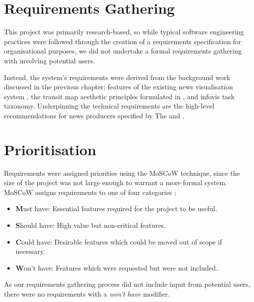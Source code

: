 \section{Requirements Gathering}
This project was primarily research-based, so while typical software engineering practices were followed through the creation of a requirements specification for organisational purposes, we did not undertake a formal requirements gathering with involving potential users.

Instead, the system's requirements were derived from the background work discussed in the previous chapter; features of the existing news visualisation system \citep{GeneratingInformationMaps}, the transit map aesthetic principles formulated in \citep{AutomaticMetroMapLayoutThesis, AutomaticMetroMapLayout}, and  infovis task taxonomy. Underpinning the technical requirements are the high-level recommendations for news producers specified by The \cite{anewmodelfornews} and \cite{overloadjournalismsbattle}. 

\section{Prioritisation}
Requirements were assigned priorities using the MoSCoW technique, since the size of the project was not large enough to warrant a more formal system. MoSCoW assigns requirements to one of four categories \citep{PrioritizationUsingMoscow};
\begin{itemize}[noitemsep]
	\item\textbf{M}ust have: Essential features required for the project to be useful.
	\item\textbf{S}hould have: High value but non-critical features.
	\item\textbf{C}ould have: Desirable features which could be moved out of scope if necessary.
	\item\textbf{W}on't have: Features which were requested but were not included. 
\end{itemize}
As our requirements gathering process did not include input from potential users, there were no requirements with a \textit{won't have} modifier.

